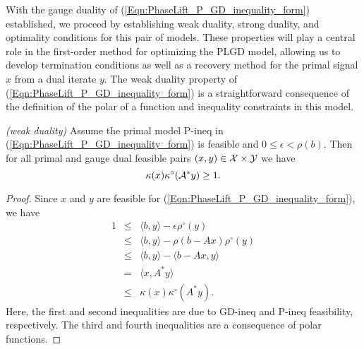 With the gauge duality of (\ref{Eqn:PhaseLift_P_GD_inequality_form}) established, we proceed by establishing weak duality, strong duality, and optimality conditions for this pair of models.  These properties will play a central role in the first-order method for optimizing the PLGD model, allowing us to develop termination conditions as well as a recovery method for the primal signal $x$ from a dual iterate $y$.  The weak duality property of (\ref{Eqn:PhaseLift_P_GD_inequality_form}) is a straightforward consequence of the definition of the polar of a function and inequality constraints in this model.

\begin{prop} \label{Prop:weak_duality}
\emph{(weak duality)}
Assume the primal model P-ineq in (\ref{Eqn:PhaseLift_P_GD_inequality_form}) is feasible and $0 \leq \epsilon < \rho(b)$.  Then for all primal and gauge dual feasible pairs $(x, y) \in {\mathcal X} \times {\mathcal Y}$ we have
\begin{equation}				\label{Eqn:weak_duality}
\kappa(x) \kappa^\circ ( {\mathcal A}^* y ) \geq 1.
\end{equation}

\end{prop}
\begin{proof}
Since $x$ and $y$ are feasible for (\ref{Eqn:PhaseLift_P_GD_inequality_form}), we have
\begin{equation} 		\label{Eqn:weak_duality_inequalities}
\begin{array}{rcl}
1 
	&	\leq 	&	\langle b, y \rangle - \epsilon \rho^\circ(y)	\\
	&	\leq 	&	\langle b, y \rangle - \rho(b - Ax) \rho^\circ(y) \\
	&	\leq 	&	\langle b, y \rangle - \langle b - Ax, y \rangle \\
	&	=		&	\langle x, A^*y \rangle \\	
	&	\leq 	&	\kappa(x) \kappa^\circ(A^*y).
\end{array}
\end{equation}
Here, the first and second inequalities are due to GD-ineq and P-ineq feasibility, respectively.  The third and fourth inequalities are a consequence of polar functions.
\end{proof}




